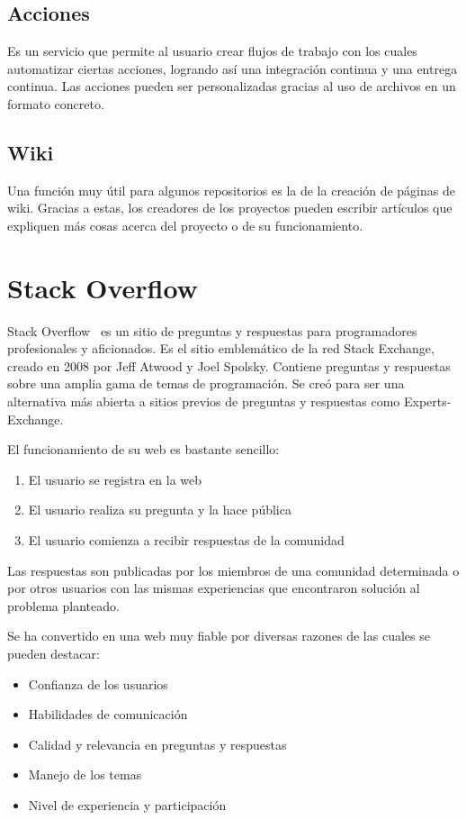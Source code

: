 \documentclass[a4paper, 12pt]{book}
\begin{document}
\subsection{Acciones}

Es un servicio que permite al usuario crear flujos de trabajo con los cuales automatizar ciertas acciones, logrando así una integración continua y una entrega continua. Las acciones pueden ser personalizadas gracias al uso de archivos en un formato concreto.

\subsection{Wiki}

Una función muy útil para algunos repositorios es la de la creación de páginas de wiki. Gracias a estas, los creadores de los proyectos pueden escribir artículos que expliquen más cosas acerca del proyecto o de su funcionamiento.

\section{Stack Overflow}
\label{Stack Overflow}

Stack Overflow~\cite{website:StackOverflow} es un sitio de preguntas y respuestas para programadores profesionales y aficionados. Es el sitio emblemático de la red Stack Exchange, creado en 2008 por Jeff Atwood y Joel Spolsky. Contiene preguntas y respuestas sobre una amplia gama de temas de programación. Se creó para ser una alternativa más abierta a sitios previos de preguntas y respuestas como Experts-Exchange.

El funcionamiento de su web es bastante sencillo:
\begin{enumerate}
	\item El usuario se registra en la web
	\item El usuario realiza su pregunta y la hace pública
	\item El usuario comienza a recibir respuestas de la comunidad
\end{enumerate}

Las respuestas son publicadas por los miembros de una comunidad determinada o por otros usuarios con las mismas experiencias que encontraron solución al problema planteado.

Se ha convertido en una web muy fiable por diversas razones de las cuales se pueden destacar:

\begin{itemize}
	\item Confianza de los usuarios
	\item Habilidades de comunicación
	\item Calidad y relevancia en preguntas y respuestas
	\item Manejo de los temas
	\item Nivel de experiencia y participación
\end{itemize}
\end{document}
